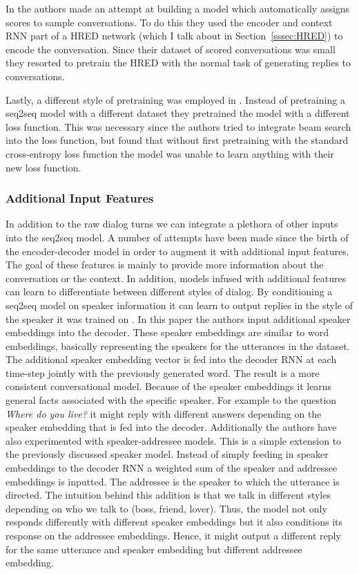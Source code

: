 \documentclass[12pt]{article}
\begin{document}
In \cite{Lowe:2017} the authors made an attempt at building a model which automatically assigns scores to sample conversations. To do this they used the encoder and context RNN part of a HRED network (which I talk about in Section~\ref{sssec:HRED}) to encode the conversation. Since their dataset of scored conversations was small they resorted to pretrain the HRED with the normal task of generating replies to conversations.

Lastly, a different style of pretraining was employed in \cite{Wiseman:2016}. Instead of pretraining a seq2seq model with a different dataset they pretrained the model with a different loss function. This was necessary since the authors tried to integrate beam search into the loss function, but found that without first pretraining with the standard cross-entropy loss function the model was unable to learn anything with their new loss function.

\subsubsection{Additional Input Features} \label{sssec:priors}
In addition to the raw dialog turns we can integrate a plethora of other inputs into the seq2seq model. A number of attempts have been made since the birth of the encoder-decoder model in order to augment it with additional input features. The goal of these features is mainly to provide more information about the conversation or the context. In addition, models infused with additional features can learn to differentiate between different styles of dialog. By conditioning a seq2seq model on speaker information it can learn to output replies in the style of the speaker it was trained on \cite{Li:2016}. In this paper the authors input additional speaker embeddings into the decoder. These speaker embeddings are similar to word embeddings, basically representing the speakers for the utterances in the dataset. The additional speaker embedding vector is fed into the decoder RNN at each time-step jointly with the previously generated word. The result is a more consistent conversational model. Because of the speaker embeddings it learns general facts associated with the specific speaker. For example to the question \textit{Where do you live?} it might reply with different answers depending on the speaker embedding that is fed into the decoder. Additionally the authors have also experimented with speaker-addressee models. This is a simple extension to the previously discussed speaker model. Instead of simply feeding in speaker embeddings to the decoder RNN a weighted sum of the speaker and addressee embeddings is inputted. The addressee is the speaker to which the utterance is directed. The intuition behind this addition is that we talk in different styles depending on who we talk to (boss, friend, lover). Thus, the model not only responds differently with different speaker embeddings but it also conditions its response on the addressee embeddings. Hence, it might output a different reply for the same utterance and speaker embedding but different addressee embedding.
\end{document}
